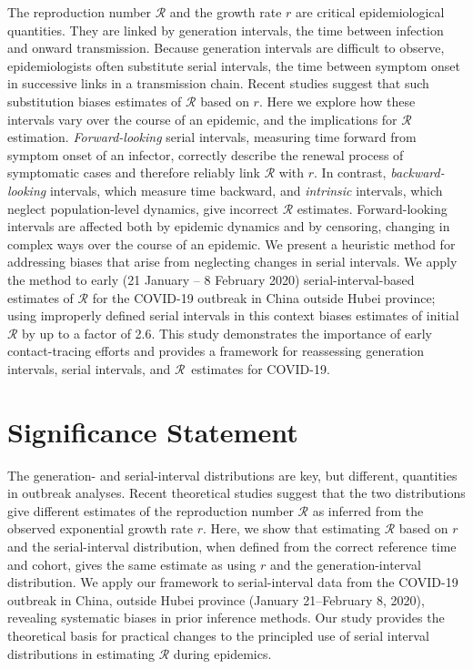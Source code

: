 \documentclass[12pt]{article}
\newcommand{\RR}{\ensuremath{{\mathcal R}}\xspace}
\begin{document}
The reproduction number \RR and the growth rate $r$ are critical epidemiological quantities.
They are linked by generation intervals, the time between infection and onward transmission.
Because generation intervals are difficult to observe, epidemiologists often substitute serial intervals, the time between symptom onset in successive links in a transmission chain.
Recent studies suggest that such substitution biases estimates of \RR based on $r$.
Here we explore how these intervals vary over the course of an epidemic, and the implications for \RR estimation.
\emph{Forward-looking} serial intervals, measuring time forward from symptom onset of an infector, correctly describe the renewal process of symptomatic cases and therefore reliably link \RR with $r$.
In contrast, \emph{backward-looking} intervals, which measure time backward, and \emph{intrinsic} intervals, which neglect population-level dynamics, give incorrect \RR estimates.
Forward-looking intervals are affected both by epidemic dynamics and by censoring, changing in complex ways over the course of an epidemic.
We present a heuristic method for addressing biases that arise from neglecting changes in serial intervals. 
We apply the method to early (21 January -- 8 February 2020) serial-interval-based estimates of  \RR for the COVID-19 outbreak in China outside Hubei province; using improperly defined serial intervals in this context biases estimates of initial \RR by up to a factor of 2.6.
This study demonstrates the importance of early contact-tracing efforts and provides a framework for reassessing generation intervals, serial intervals, and \RR\ estimates for COVID-19.

\section*{Significance Statement}

The generation- and serial-interval distributions are key, but different, quantities in outbreak analyses.
Recent theoretical studies suggest that the two distributions give different estimates of the reproduction number \RR as inferred from the observed exponential growth rate $r$.
Here, we show that estimating \RR based on $r$ and the serial-interval distribution, when defined from the correct reference time and cohort, gives the same estimate as using $r$ and the generation-interval distribution.
We apply our framework to serial-interval data from the COVID-19 outbreak in China, outside Hubei province (January  21--February 8, 2020), revealing systematic biases in prior inference methods.
Our study provides the theoretical basis for practical changes to the principled use of serial interval distributions in estimating \RR during epidemics.
\end{document}
